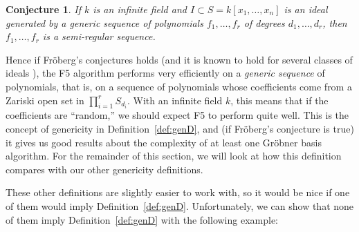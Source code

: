 \documentclass[11pt]{article}
\newtheorem{conjecture}{Conjecture}
\theoremstyle{definition}
\begin{document}
\begin{conjecture}\label{Fr:equiv}
	If $k$ is an infinite field and $I \subset S = k[x_1, \dots, x_n]$ is an ideal generated by a generic sequence of polynomials $f_1, \dots, f_r$ of degrees $d_1, \dots, d_r$, then $f_1, \dots, f_r$ is a semi-regular sequence. 
\end{conjecture}


Hence if Fröberg's conjectures holds (and it is known to hold for several classes of ideals \cite{TRUNG201979}), the F5 algorithm performs very efficiently on a \emph{generic sequence} of polynomials, that is, on a sequence of polynomials whose coefficients come from a Zariski open set in $\prod_{i = 1}^r S_{d_i}$. With an infinite field $k$, this means that if the coefficients are ``random,'' we should expect F5 to perform quite well. This is the concept of genericity in Definition~\ref{def:genD}, and (if Fröberg's conjecture is true) it gives us good results about the complexity of at least one Gröbner basis algorithm. For the remainder of this section, we will look at how this definition compares with our other genericity definitions. 

These other definitions are slightly easier to work with, so it would be nice if one of them would imply Definition~\ref{def:genD}. Unfortunately, we can show that none of them imply Definition~\ref{def:genD} with the following example:
\end{document}
